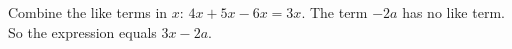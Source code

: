 Combine the like terms in $x$: $4x+5x-6x=3x$. The term $-2a$ has no like term. So the expression equals $\boxed{3x-2a}$.
